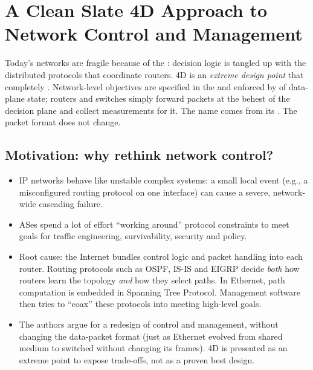 \chapter{A Clean Slate 4D Approach to Network Control and Management}

\begin{keybox}
Today's networks are fragile because of the : decision logic is tangled up with the distributed protocols that coordinate routers. 4D is an \emph{extreme design point} that completely . Network-level objectives are specified in the  and enforced by  of data-plane state; routers and switches simply forward packets at the behest of the decision plane and collect measurements for it. The name comes from its . The packet format does not change.
\end{keybox}

\section{Motivation: why rethink network control?}
\begin{itemize}
\item IP networks behave like unstable complex systems: a small local event (e.g., a misconfigured routing protocol on one interface) can cause a severe, network-wide cascading failure.
\item ASes spend a lot of effort ``working around'' protocol constraints to meet goals for traffic engineering, survivability, security and policy.
\item Root cause: the Internet bundles control logic and packet handling into each router. Routing protocols such as OSPF, IS-IS and EIGRP decide \emph{both} how routers learn the topology \emph{and} how they select paths. In Ethernet, path computation is embedded in Spanning Tree Protocol. Management software then tries to ``coax'' these protocols into meeting high-level goals.
\item The authors argue for a  redesign of control and management, without changing the data-packet format (just as Ethernet evolved from shared medium to switched without changing its frames). 4D is presented as an extreme point to expose trade-offs, not as a proven best design.
\end{itemize}

